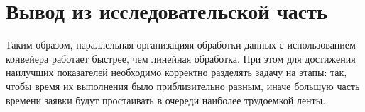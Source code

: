 \section{Вывод из исследовательской часть}

Таким образом, параллельная организацияя обработки данных с использованием конвейера  работает быстрее, чем линейная обработка. При этом для достижения наилучших показателей необходимо корректно разделять задачу на этапы: так, чтобы время их выполнения было приблизительно равным, иначе большую часть времени заявки будут простаивать в очереди наиболее трудоемкой ленты.